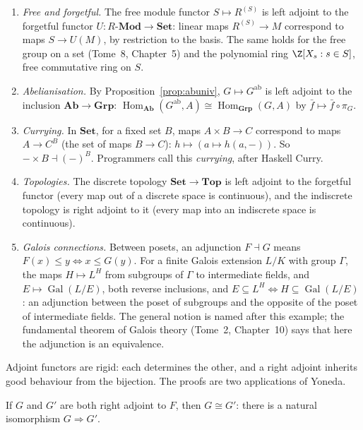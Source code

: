 \begin{example}\label{ex:adjunctions}
\leavevmode
\begin{enumerate}[label=(\alph*)]
\item \emph{Free and forgetful.} The free module functor $S\mapsto R^{(S)}$ is left adjoint to the forgetful functor $U\colon R\text{-}\mathbf{Mod}\to\mathbf{Set}$: linear maps $R^{(S)}\to M$ correspond to maps $S\to U(M)$, by restriction to the
basis. The same holds for the free group on a set (Tome~8, Chapter~5) and the polynomial ring $\Z[X_s:s\in S]$, free commutative ring on $S$.
\item \emph{Abelianisation.} By Proposition~\ref{prop:abuniv}, $G\mapsto G^{\mathrm{ab}}$ is left adjoint to the inclusion $\mathbf{Ab}\to\mathbf{Grp}$: $\operatorname{Hom}_{\mathbf{Ab}}(G^{\mathrm{ab}},A)\cong\operatorname{Hom}_{\mathbf{Grp}}(G,A)$ by $\bar f\mapsto\bar f\circ\pi_G$.
\item \emph{Currying.} In $\mathbf{Set}$, for a fixed set $B$, maps $A\times B\to C$ correspond to maps $A\to C^B$ (the set of maps $B\to C$): $h\mapsto(a\mapsto h(a,-))$. So $-\times B\dashv(-)^B$. Programmers call this
\emph{currying}, after Haskell Curry.
\item \emph{Topologies.} The discrete topology $\mathbf{Set}\to\mathbf{Top}$ is left adjoint to the forgetful functor (every map out of a discrete space is continuous), and the indiscrete topology is right adjoint to it (every
map into an indiscrete space is continuous).
\item \emph{Galois connections.} Between posets, an adjunction $F\dashv G$ means $F(x)\le y\iff x\le G(y)$. For a finite Galois extension $L/K$ with group $\Gamma$, the maps $H\mapsto L^H$ from subgroups of $\Gamma$ to
intermediate fields, and $E\mapsto\operatorname{Gal}(L/E)$, both reverse inclusions, and $E\subseteq L^H\iff H\subseteq\operatorname{Gal}(L/E)$: an adjunction between the poset of subgroups and the opposite of the poset of
intermediate fields. The general notion is named after this example; the fundamental theorem of Galois theory (Tome~2, Chapter~10) says that here the adjunction is an equivalence.
\end{enumerate}
\end{example}

Adjoint functors are rigid: each determines the other, and a right adjoint inherits good behaviour from the bijection. The proofs are two applications of Yoneda.

\begin{theorem}\label{thm:adjunique}
If $G$ and $G'$ are both right adjoint to $F$, then $G\cong G'$: there is a natural isomorphism $G\Rightarrow G'$.
\end{theorem}

